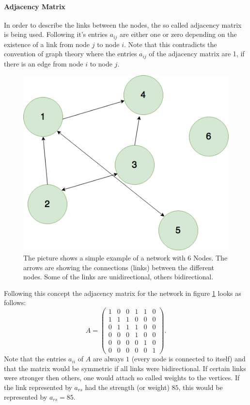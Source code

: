 \paragraph{Adjacency Matrix}
In order to describe the links between the nodes, the so called adjacency matrix is being used. Following \citep{BAR16} it's entries $a_{ij}$ are either one or zero depending on the existence of a link from node $j$ to node $i$. Note that this contradicts the convention of graph theory where the entries $a_{ij}$ of the adjacency matrix are 1, if there is an edge from node $i$ to node $j$.
\begin{figure}[htbp]
\centering
\noindent\includegraphics[width=0.4\linewidth,height=\textheight,
keepaspectratio]{Graph.png} 
\caption{The picture shows  a simple example of a network with 6 Nodes. The arrows are showing the connections (links) between the different nodes. Some of the links are unidirectional, others bidirectional.}
\label{fig:simpleNetwork}
\end{figure}
Following this concept the adjacency matrix for the network in figure \ref{fig:simpleNetwork} looks as follows:
\begin{equation}
A = \left( \begin{matrix}
 1 & 0 & 0 & 1 & 1 & 0\\
 1 & 1 & 1 & 0 & 0 & 0\\
 0 & 1 & 1 & 1 & 0 & 0\\
 0 & 0 & 0 & 1 & 0 & 0\\
 0 & 0 & 0 & 0 & 1 & 0\\
 0 & 0 & 0 & 0 & 0 & 1
 \end{matrix}
 \right). \label{eq:adjMatExamp}
\end{equation}
Note that the entries $a_{ii}$ of $A$ are always $1$ (every node is connected to itself) and that the matrix would be symmetric if all links were bidirectional. 
If certain links were stronger then others, one would attach so called weights to the vertices. If the link represented by $a_{rs}$ had the strength (or weight) $85$, this would be represented by $a_{rs}= 85$. 
